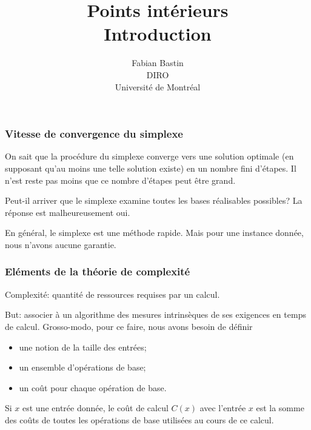 \documentclass[t, aspectratio=169,usepdftitle=false]{beamer}
\title[Introduction points intérieurs]{Points intérieurs\\Introduction}
\author[Fabian Bastin]{Fabian Bastin\\DIRO\\Université de Montréal}
\date{}
\begin{document}
\frame{\titlepage}


\begin{frame}
\frametitle{Vitesse de convergence du simplexe}

On sait que la procédure du simplexe converge vers une solution optimale (en supposant qu'au moins une telle solution existe) en un nombre fini d'étapes. Il n'est reste pas moins que ce nombre d'étapes peut être grand.



\mbox{}

Peut-il arriver que le simplexe examine toutes les bases réalisables possibles? La réponse est malheureusement oui.

\mbox{}

En général, le simplexe est une méthode rapide. Mais pour une instance donnée, nous n'avons aucune garantie.
\end{frame}

\begin{frame}
\frametitle{Eléments de la théorie de complexité}

Complexité: quantité de ressources requises par un calcul.

\mbox{}

But: associer à un algorithme des mesures intrinsèques de ses exigences en temps de calcul. Grosso-modo, pour ce faire, nous avons besoin de définir
\begin{itemize}
\item
une notion de la taille des entrées;
\item
un ensemble d'opérations de base;
\item
un coût pour chaque opération de base.
\end{itemize}

\mbox{}

Si $x$ est une entrée donnée, le coût de calcul $C(x)$ avec l'entrée $x$ est la somme des coûts de toutes les opérations de base utilisées au cours de ce calcul.

\end{frame}
\end{document}
